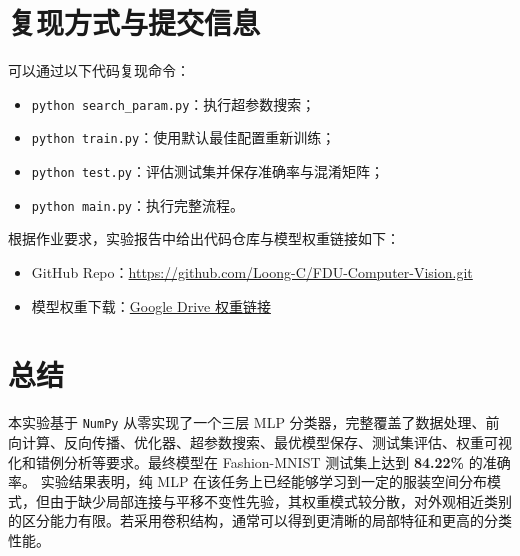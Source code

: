 \documentclass[UTF8,a4paper,12pt]{ctexart}
\begin{document}
\section{复现方式与提交信息}

可以通过以下代码复现命令：

\begin{itemize}
    \item \texttt{python search\_param.py}：执行超参数搜索；
    \item \texttt{python train.py}：使用默认最佳配置重新训练；
    \item \texttt{python test.py}：评估测试集并保存准确率与混淆矩阵；
    \item \texttt{python main.py}：执行完整流程。
\end{itemize}

根据作业要求，实验报告中给出代码仓库与模型权重链接如下：

\begin{itemize}
    \item GitHub Repo：\href{https://github.com/Loong-C/FDU-Computer-Vision.git}{https://github.com/Loong-C/FDU-Computer-Vision.git}
    \item 模型权重下载：\href{https://drive.google.com/file/d/12k378k0q2_tA5KuZpSIs9tKtFYN-TZNC/view?usp=drive_link}{Google Drive 权重链接}
\end{itemize}

\section{总结}

本实验基于 \texttt{NumPy} 从零实现了一个三层 MLP 分类器，完整覆盖了数据处理、前向计算、反向传播、优化器、超参数搜索、最优模型保存、测试集评估、权重可视化和错例分析等要求。最终模型在 Fashion-MNIST 测试集上达到 \textbf{84.22\%} 的准确率。
实验结果表明，纯 MLP 在该任务上已经能够学习到一定的服装空间分布模式，但由于缺少局部连接与平移不变性先验，其权重模式较分散，对外观相近类别的区分能力有限。若采用卷积结构，通常可以得到更清晰的局部特征和更高的分类性能。
\end{document}
